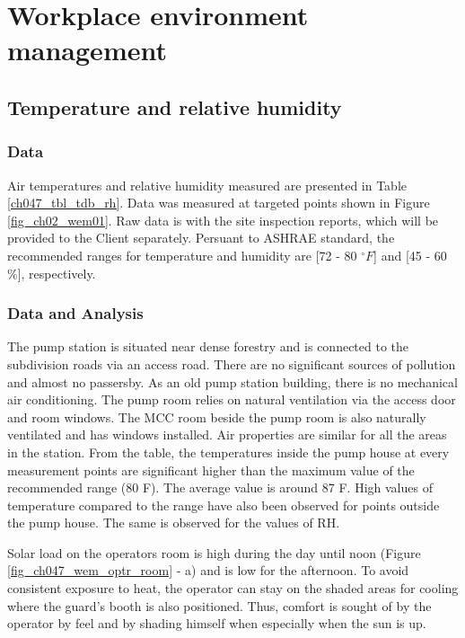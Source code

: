 
\section{Workplace environment management}
\label{47}

\subsection{Temperature and relative humidity}
\subsubsection{Data}
Air temperatures and relative humidity measured are presented in Table \ref{ch047_tbl_tdb_rh}. Data was measured at targeted points shown in Figure \ref{fig_ch02_wem01}. Raw data is with the site inspection reports, which will be provided to the Client separately. Persuant to ASHRAE standard, the recommended ranges for temperature and humidity are [72 - 80 $^\circ F$] and [45 - 60 \%], respectively.

\subsubsection{Data and Analysis}



The pump station is situated near dense forestry and is connected to the subdivision roads via an access road. There are no significant sources of pollution and almost no passersby.  
As an old pump station building, there is no mechanical air conditioning. The pump room relies on natural ventilation via the access door and room windows. The MCC room beside the pump room is also naturally ventilated and has windows installed. Air properties are similar for all the areas in the station. From the table, the temperatures inside the pump house at every measurement points are significant higher than the maximum value of the recommended range (80 F). The average value is around 87 F. High values of temperature compared to the range have also been observed for points outside the pump house. The same is observed for the values of RH.

Solar load on the operators room is high during the day until noon (Figure \ref{fig_ch047_wem_optr_room} - a) and is low for the afternoon. To avoid consistent exposure to heat, the operator can stay on the shaded areas for cooling where the guard’s booth is also positioned. Thus, comfort is sought of by the operator by feel and by shading himself when especially when the sun is up. 

